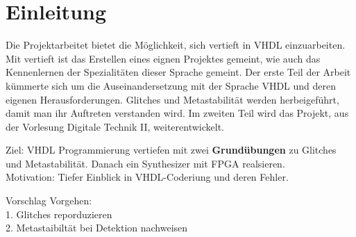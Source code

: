 
\chapter{Einleitung}\label{chap.einleitung}

Die Projektarbeitet bietet die Möglichkeit, sich vertieft in VHDL einzuarbeiten. Mit vertieft ist das Erstellen eines eignen Projektes gemeint, wie auch  das Kennenlernen der Spezialitäten dieser Sprache gemeint.
Der erste Teil der Arbeit kümmerte sich um die Auseinandersetzung mit der Sprache VHDL und deren eigenen Herausforderungen. Glitches und Metastabilität werden herbeigeführt, damit man ihr Auftreten verstanden wird. 
Im zweiten Teil wird das Projekt, aus der Vorlesung Digitale Technik II, weiterentwickelt.



Ziel: VHDL Programmierung vertiefen mit zwei \textbf{Grundübungen} zu Glitches und Metastabilität. Danach ein Synthesizer mit FPGA realsieren.\\
Motivation: Tiefer Einblick in VHDL-Coderiung und deren Fehler.\\
\newline

Vorschlag Vorgehen:\\
1. Glitches reporduzieren\\
2. Metastaibiltät bei Detektion nachweisen\\
